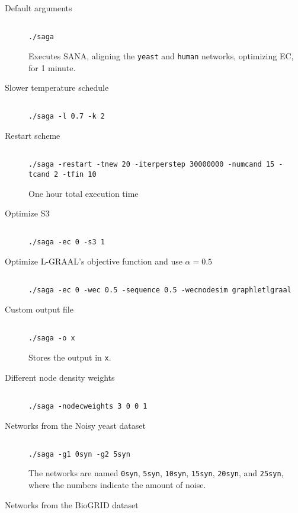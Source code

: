 \documentclass[]{article}
\begin{document}
\begin{description}
\item[Default arguments]
\begin{verbatim}

./saga
\end{verbatim}
Executes SANA, aligning the \texttt{yeast} and \texttt{human} networks, optimizing EC, for 1 minute.
\item[Slower temperature schedule]
\begin{verbatim}

./saga -l 0.7 -k 2
\end{verbatim}
\item[Restart scheme]
\begin{verbatim}

./saga -restart -tnew 20 -iterperstep 30000000 -numcand 15 -tcand 2 -tfin 10
\end{verbatim}
One hour total execution time
\item[Optimize S3]
\begin{verbatim}

./saga -ec 0 -s3 1
\end{verbatim}
\item[Optimize L-GRAAL's objective function and use $\alpha=0.5$]
\begin{verbatim}

./saga -ec 0 -wec 0.5 -sequence 0.5 -wecnodesim graphletlgraal
\end{verbatim}
\item[Custom output file]
\begin{verbatim}

./saga -o x
\end{verbatim}
Stores the output in \texttt{x}.
\item[Different node density weights]
\begin{verbatim}

./saga -nodecweights 3 0 0 1
\end{verbatim}
\item[Networks from the Noisy yeast dataset]
\begin{verbatim}

./saga -g1 0syn -g2 5syn
\end{verbatim}
The networks are named \texttt{0syn}, \texttt{5syn}, \texttt{10syn}, \texttt{15syn}, \texttt{20syn}, and \texttt{25syn}, where the numbers indicate the amount of noise.
\item[Networks from the BioGRID dataset]
\begin{verbatim}


\end{verbatim}
\end{description}
\end{document}
